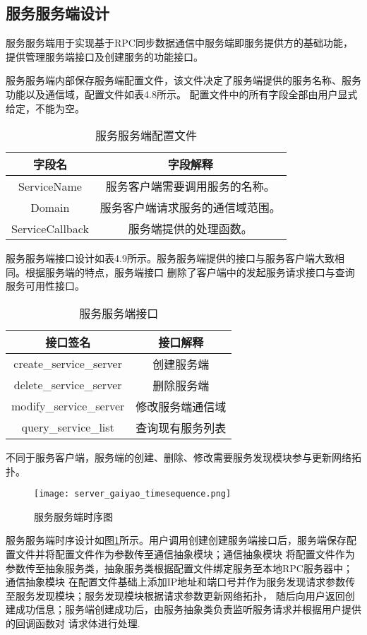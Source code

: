 \subsection{服务服务端设计}
服务服务端用于实现基于RPC同步数据通信中服务端即服务提供方的基础功能，提供管理服务端接口及创建服务的功能接口。

服务服务端内部保存服务端配置文件，该文件决定了服务端提供的服务名称、服务功能以及通信域，配置文件如表4.8所示。
配置文件中的所有字段全部由用户显式给定，不能为空。
\begin{table}[H]
  \centering\small
  \caption{服务服务端配置文件}
  \label{tab:exampletable}
  \begin{tabular}{cc}
    \toprule
    字段名 & 字段解释 \\
    \midrule
    ServiceName & 服务客户端需要调用服务的名称。\\
    Domain & 服务客户端请求服务的通信域范围。\\
    ServiceCallback & 服务端提供的处理函数。\\
    \bottomrule
  \end{tabular}
\end{table}

服务服务端接口设计如表4.9所示。服务服务端提供的接口与服务客户端大致相同。根据服务端的特点，服务端接口
删除了客户端中的发起服务请求接口与查询服务可用性接口。
\begin{table}[htb]
  \centering\small
  \caption{服务服务端接口}
  \label{tab:exampletable}
  \begin{tabular}{cc}
    \toprule
    接口签名 & 接口解释 \\
    \midrule
    create\_service\_server & 创建服务端 \\
    delete\_service\_server & 删除服务端\\
    modify\_service\_server & 修改服务端通信域\\
    query\_service\_list & 查询现有服务列表\\
    \bottomrule
  \end{tabular}
\end{table}

不同于服务客户端，服务端的创建、删除、修改需要服务发现模块参与更新网络拓扑。

\begin{figure}[H]
  \centering
  \texttt{[image: server\_gaiyao\_timesequence.png]}
  \caption{服务服务端时序图}
  \label{server_gaiyao_timesequence}
\end{figure}

服务服务端时序设计如图\ref{server_gaiyao_timesequence}所示。用户调用创建创建服务端接口后，服务端保存配置文件并将配置文件作为参数传至通信抽象模块；通信抽象模块
将配置文件作为参数传至抽象服务类，抽象服务类根据配置文件绑定服务至本地RPC服务器中；通信抽象模块
在配置文件基础上添加IP地址和端口号并作为服务发现请求参数传至服务发现模块；服务发现模块根据请求参数更新网络拓扑，
随后向用户返回创建成功信息；服务端创建成功后，由服务抽象类负责监听服务请求并根据用户提供的回调函数对
请求体进行处理.


